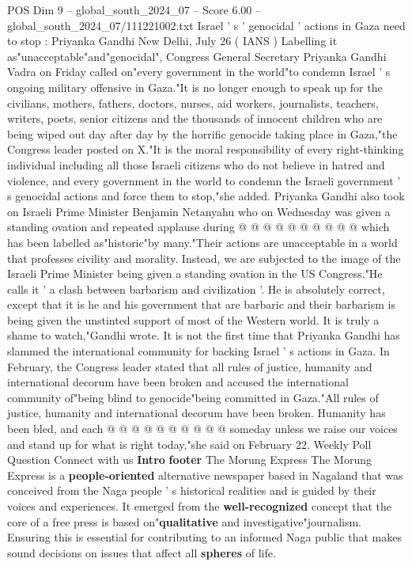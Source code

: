 \begin{textsample}{POS Dim 9 – global\_south\_2024\_07 – Score 6.00 – global\_south\_2024\_07/111221002.txt}  \label{ex:f9_pos_101}
Israel ' s ' genocidal ' actions in Gaza need to stop : Priyanka Gandhi New Delhi, July 26 ( IANS ) Labelling it as"unacceptable"and"genocidal", Congress General Secretary Priyanka Gandhi Vadra on Friday called on"every government in the world"to condemn Israel ' s ongoing military offensive in Gaza."It is no longer enough to speak up for the civilians, mothers, fathers, doctors, nurses, aid workers, journalists, teachers, writers, poets, senior citizens and the thousands of innocent children who are being wiped out day after day by the horrific genocide taking place in Gaza,"the Congress leader posted on X."It is the moral responsibility of every right-thinking individual including all those Israeli citizens who do not believe in hatred and violence, and every government in the world to condemn the Israeli government ' s genocidal actions and force them to stop,"she added.
Priyanka Gandhi also took on Israeli Prime Minister Benjamin Netanyahu who on Wednesday was given a standing ovation and repeated applause during @ @ @ @ @ @ @ @ @ @ which has been labelled as"historic"by many."Their actions are unacceptable in a world that professes civility and morality.
Instead, we are subjected to the image of the Israeli Prime Minister being given a standing ovation in the US Congress."He calls it ' a clash between barbarism and civilization '.
He is absolutely correct, except that it is he and his government that are barbaric and their barbarism is being given the unstinted support of most of the Western world.
It is truly a shame to watch,"Gandhi wrote.
It is not the first time that Priyanka Gandhi has slammed the international community for backing Israel ' s actions in Gaza.
In February, the Congress leader stated that all rules of justice, humanity and international decorum have been broken and accused the international community of"being blind to genocide"being committed in Gaza."All rules of justice, humanity and international decorum have been broken.
Humanity has been bled, and each @ @ @ @ @ @ @ @ @ @ someday unless we raise our voices and stand up for what is right today,"she said on February 22.
Weekly Poll Question Connect with us \textbf{Intro} \textbf{footer} The Morung Express The Morung Express is a \textbf{people-oriented} alternative newspaper based in Nagaland that was conceived from the Naga people ' s historical realities and is guided by their voices and experiences.
It emerged from the \textbf{well-recognized} concept that the core of a free press is based on"\textbf{qualitative} and investigative"journalism.
Ensuring this is essential for contributing to an informed Naga public that makes sound decisions on issues that affect all \textbf{spheres} of life.

\end{textsample}
